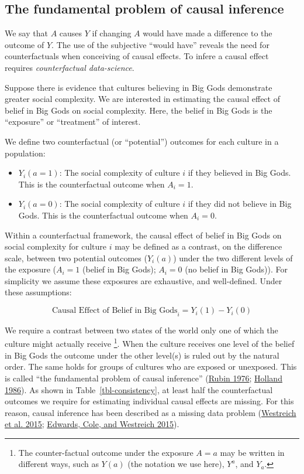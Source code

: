 \documentclass[
  singlecolumn]{report}
\providecommand{\tightlist}{%
  \setlength{\itemsep}{0pt}\setlength{\parskip}{0pt}}\usepackage{longtable,booktabs,array}
\begin{document}
\hypertarget{the-fundamental-problem-of-causal-inference}{%
\subsection{The fundamental problem of causal
inference}\label{the-fundamental-problem-of-causal-inference}}

We say that \(A\) causes \(Y\) if changing \(A\) would have made a
difference to the outcome of \(Y\). The use of the subjective ``would
have'' reveals the need for counterfactuals when conceiving of causal
effects. To infere a causal effect requires \emph{counterfactual
data-science}.

Suppose there is evidence that cultures believing in Big Gods
demonstrate greater social complexity. We are interested in estimating
the causal effect of belief in Big Gods on social complexity. Here, the
belief in Big Gods is the ``exposure'' or ``treatment'' of interest.

We define two counterfactual (or ``potential'') outcomes for each
culture in a population:

\begin{itemize}
\tightlist
\item
  \(Y_i(a = 1)\): The social complexity of culture \(i\) if they
  believed in Big Gods. This is the counterfactual outcome when
  \(A_i = 1\).
\item
  \(Y_i(a = 0)\): The social complexity of culture \(i\) if they did not
  believe in Big Gods. This is the counterfactual outcome when
  \(A_i = 0\).
\end{itemize}

Within a counterfactual framework, the causal effect of belief in Big
Gods on social complexity for culture \(i\) may be defined as a
contrast, on the difference scale, between two potential outcomes
(\(Y_i(a)\)) under the two different levels of the exposure (\(A_i = 1\)
(belief in Big Gods); \(A_i = 0\) (no belief in Big Gods)). For
simplicity we assume these exposures are exhaustive, and well-defined.
Under these assumptions:

\[
\text{Causal Effect of Belief in Big Gods}_i = Y_i(1) - Y_i(0) 
\]

We require a contrast between two states of the world only one of which
the culture might actually receive \footnote{The counter-factual outcome
  under the exposure \(A = a\) may be written in different ways, such as
  \(Y(a)\) (the notation we use here), \(Y^a\), and \(Y_a\).}. When the
culture receives one level of the belief in Big Gods the outcome under
the other level(s) is ruled out by the natural order. The same holds for
groups of cultures who are exposed or unexposed. This is called ``the
fundamental problem of causal inference''
(\protect\hyperlink{ref-rubin1976}{Rubin 1976};
\protect\hyperlink{ref-holland1986}{Holland 1986}). As shown in
Table~\ref{tbl-consistency}, at least half the counterfactual outcomes
we require for estimating individual causal effects are missing. For
this reason, causal inference has been described as a missing data
problem (\protect\hyperlink{ref-westreich2015}{Westreich et al. 2015};
\protect\hyperlink{ref-edwards2015}{Edwards, Cole, and Westreich 2015}).
\end{document}
